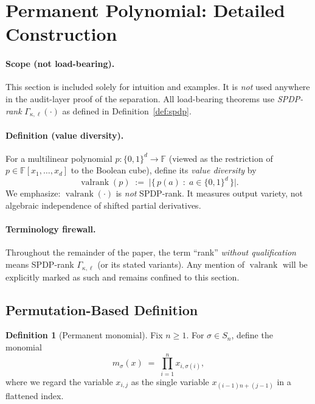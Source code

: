 \documentclass[12pt]{article}
\newcommand{\valrank}{\operatorname{valrank}}
\theoremstyle{definition}
\newtheorem{definition}{Definition}
\theoremstyle{definition}
\theoremstyle{remark}
\theoremstyle{remark}
\begin{document}
\section{Permanent Polynomial: Detailed Construction}

\paragraph{Scope (not load-bearing).}
This section is included solely for intuition and examples.
It is \emph{not} used anywhere in the audit-layer proof of the separation.
All load-bearing theorems use \emph{SPDP-rank} $\Gamma_{\kappa,\ell}(\cdot)$ as defined in
Definition~\ref{def:spdp}.

\paragraph{Definition (value diversity).}
For a multilinear polynomial $p:\{0,1\}^d\to \mathbb{F}$ (viewed as the restriction of
$p\in\mathbb{F}[x_1,\dots,x_d]$ to the Boolean cube), define its \emph{value diversity} by
\[
\valrank(p)\;:=\;\bigl|\{\,p(a)\;:\;a\in\{0,1\}^d\,\}\bigr|.
\]
We emphasize: $\valrank(\cdot)$ is \emph{not} SPDP-rank. It measures output variety, not
algebraic independence of shifted partial derivatives.

\paragraph{Terminology firewall.}
Throughout the remainder of the paper, the term ``rank'' \emph{without qualification}
means SPDP-rank $\Gamma_{\kappa,\ell}$ (or its stated variants). Any mention of $\valrank$
will be explicitly marked as such and remains confined to this section.

\subsection{Permutation-Based Definition}

\begin{definition}[Permanent monomial]
Fix $n \geq 1$. For $\sigma \in S_n$, define the monomial
\[
m_\sigma(x) \;=\; \prod_{i=1}^n x_{i,\sigma(i)},
\]
where we regard the variable $x_{i,j}$ as the single variable $x_{(i-1)n+(j-1)}$ in a flattened index.
\end{definition}

\end{document}
